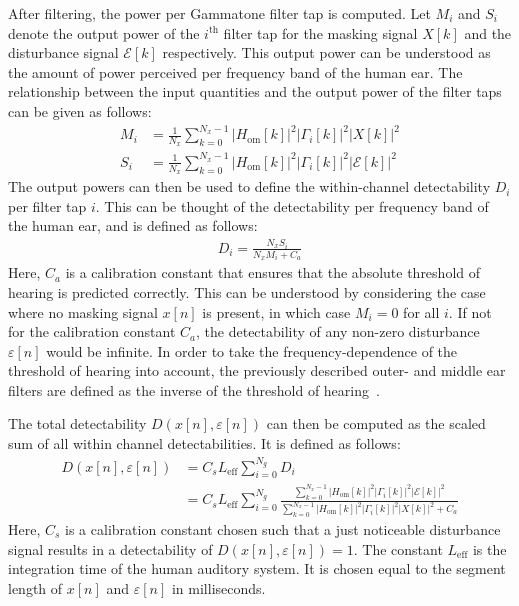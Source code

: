 After filtering, the power per Gammatone filter tap is computed.
Let $M_i$ and $S_i$ denote the output power of the $i^\text{th}$ filter tap for the masking signal $X[k]$ and 
the disturbance signal $\mathcal{E}[k]$ respectively.
This output power can be understood as the amount of power perceived per frequency band of the human ear. 
The relationship between the input quantities and the output power of the filter taps can be given as follows:
\begin{align}
    M_i &= \frac{1}{N_x}\sum_{k=0}^{N_x-1}\left|H_\text{om}[k]\right|^2\left|\Gamma_i[k]\right|^2\left|X[k]\right|^2 \\
    S_i &= \frac{1}{N_x}\sum_{k=0}^{N_x-1}\left|H_\text{om}[k]\right|^2\left|\Gamma_i[k]\right|^2\left|\mathcal{E}[k]\right|^2 
\end{align}
The output powers can then be used to define the within-channel detectability $D_i$ per filter tap $i$.
This can be thought of the detectability per frequency band of the human ear, and is defined as follows:
\begin{align}
    D_i = \frac{N_xS_i}{N_xM_i + C_a}
\end{align}
Here, $C_a$ is a calibration constant that ensures that the absolute threshold of hearing is predicted correctly.
This can be understood by considering the case where no masking signal $x[n]$ is present, 
in which case $M_i = 0$ for all $i$.
If not for the calibration constant $C_a$, the detectability of any non-zero disturbance $\varepsilon[n]$ would be infinite.
In order to take the frequency-dependence of the threshold of hearing into account, the previously described outer- and middle ear filters are defined as the
inverse of the threshold of hearing~\cite{van2005perceptual}.

The total detectability $D(x[n],\varepsilon[n])$ can then be computed as the scaled sum of all within channel detectabilities.
It is defined as follows:
\begin{align}
    D(x[n],\varepsilon[n]) &= C_s L_\text{eff}\sum_{i=0}^{N_g} D_i \\
                        &= C_s L_\text{eff}\sum_{i=0}^{N_g} 
                        \frac{\sum_{k=0}^{N_x-1}\left|H_\text{om}[k]\right|^2\left|
                            \Gamma_i[k]\right|^2\left|\mathcal{E}[k]\right|^2}
                        {\sum_{k=0}^{N_x-1}\left|H_\text{om}[k]\right|^2\left|
                            \Gamma_i[k]\right|^2\left|X[k]\right|^2 + C_a}
    \label{eq:perceptual:implementation:computation:detectability}
\end{align}
Here, $C_s$ is a calibration constant chosen such that a just noticeable disturbance signal results in a 
detectability of $D(x[n],\varepsilon[n]) = 1$. 
The constant $L_\text{eff}$ is the integration time of the human auditory system.
It is chosen equal to the segment length of $x[n]$ and $\varepsilon[n]$ in milliseconds.  

